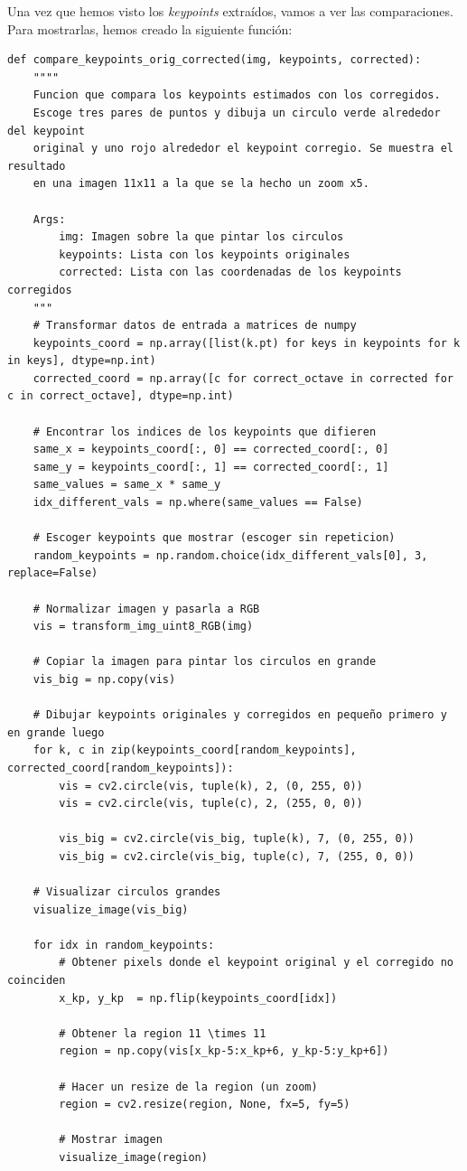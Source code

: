 \documentclass[11pt,a4paper]{article}
\begin{document}
Una vez que hemos visto los \textit{keypoints} extraídos, vamos a ver las comparaciones. Para
mostrarlas, hemos creado la siguiente función:

\begin{lstlisting}
def compare_keypoints_orig_corrected(img, keypoints, corrected):
    """"
    Funcion que compara los keypoints estimados con los corregidos.
    Escoge tres pares de puntos y dibuja un circulo verde alrededor del keypoint
    original y uno rojo alrededor el keypoint corregio. Se muestra el resultado
    en una imagen 11x11 a la que se la hecho un zoom x5.
    
    Args:
        img: Imagen sobre la que pintar los circulos 
        keypoints: Lista con los keypoints originales
        corrected: Lista con las coordenadas de los keypoints corregidos
    """
    # Transformar datos de entrada a matrices de numpy
    keypoints_coord = np.array([list(k.pt) for keys in keypoints for k in keys], dtype=np.int)
    corrected_coord = np.array([c for correct_octave in corrected for c in correct_octave], dtype=np.int)

    # Encontrar los indices de los keypoints que difieren
    same_x = keypoints_coord[:, 0] == corrected_coord[:, 0]
    same_y = keypoints_coord[:, 1] == corrected_coord[:, 1]
    same_values = same_x * same_y
    idx_different_vals = np.where(same_values == False)

    # Escoger keypoints que mostrar (escoger sin repeticion)
    random_keypoints = np.random.choice(idx_different_vals[0], 3, replace=False)

    # Normalizar imagen y pasarla a RGB
    vis = transform_img_uint8_RGB(img)

    # Copiar la imagen para pintar los circulos en grande
    vis_big = np.copy(vis)

    # Dibujar keypoints originales y corregidos en pequeño primero y en grande luego
    for k, c in zip(keypoints_coord[random_keypoints], corrected_coord[random_keypoints]):
        vis = cv2.circle(vis, tuple(k), 2, (0, 255, 0))
        vis = cv2.circle(vis, tuple(c), 2, (255, 0, 0))

        vis_big = cv2.circle(vis_big, tuple(k), 7, (0, 255, 0))
        vis_big = cv2.circle(vis_big, tuple(c), 7, (255, 0, 0))
    
    # Visualizar circulos grandes
    visualize_image(vis_big)

    for idx in random_keypoints:
        # Obtener pixels donde el keypoint original y el corregido no coinciden
        x_kp, y_kp  = np.flip(keypoints_coord[idx])

        # Obtener la region 11 \times 11
        region = np.copy(vis[x_kp-5:x_kp+6, y_kp-5:y_kp+6])

        # Hacer un resize de la region (un zoom)
        region = cv2.resize(region, None, fx=5, fy=5)

        # Mostrar imagen
        visualize_image(region)
\end{lstlisting}
\end{document}
